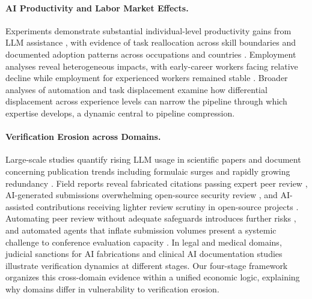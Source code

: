 \documentclass{article}
\theoremstyle{plain}
\theoremstyle{definition}
\theoremstyle{remark}
\begin{document}
\paragraph{AI Productivity and Labor Market Effects.}
Experiments demonstrate substantial individual-level productivity gains from LLM assistance \citep{doi:10.1126/science.adh2586, 10.1093/qje/qjae044}, with evidence of task reallocation across skill boundaries \citep{DellAcqua2023NavigatingTJ} and documented adoption patterns across occupations and countries \citep{doi:10.1126/science.adj0998, Chatterji2025How}. Employment analyses reveal heterogeneous impacts, with early-career workers facing relative decline while employment for experienced workers remained stable \citep{brynjolfsson2025canaries, signalfire2025talent}. Broader analyses of automation and task displacement \citep{10.1257/jep.33.2.3, hazra2025position} examine how differential displacement across experience levels can narrow the pipeline through which expertise develops, a dynamic central to pipeline compression.

\paragraph{Verification Erosion across Domains.}
Large-scale studies quantify rising LLM usage in scientific papers \citep{liang-etal-2025-quantifying} and document concerning publication trends including formulaic surges \citep{suchak-etal-2025-explosion} and rapidly growing redundancy \citep{maupin-etal-2025-dramatic}. Field reports reveal fabricated citations passing expert peer review \citep{esau-etal-2025-gptzero}, AI-generated submissions overwhelming open-source security review \citep{stenberg2025deathslops}, and AI-assisted contributions receiving lighter review scrutiny in open-source projects \citep{gao2026autopilot}. Automating peer review without adequate safeguards introduces further risks \citep{baumann2026stopautomatingpeerreview}, and automated agents that inflate submission volumes present a systemic challenge to conference evaluation capacity \citep{shan2026positionacademicconferencespotentially}. In legal and medical domains, judicial sanctions for AI fabrications \citep{mata2023sanctions, baylson2023aiorder} and clinical AI documentation studies \citep{zaretsky2024discharge, small2025hospitalcourse, song2025eddischarge} illustrate verification dynamics at different stages. Our four-stage framework organizes this cross-domain evidence within a unified economic logic, explaining why domains differ in vulnerability to verification erosion.
\end{document}
